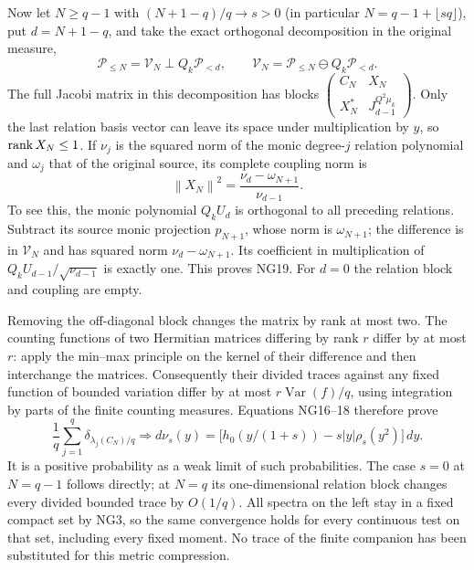 \documentclass[11pt]{article}
\newcommand{\PP}{\mathcal P}\newcommand{\dd}{\,d}
\newcommand{\norm}[1]{\left\lVert#1\right\rVert}
\begin{document}
Now let $N\ge q-1$ with $(N+1-q)/q\to s>0$ (in particular
$N=q-1+\lfloor sq\rfloor$), put $d=N+1-q$, and take the exact
orthogonal decomposition in the original measure,
\begin{equation}\tag{NG18}
 \PP_{\le N}=\mathcal V_N\mathbin{\perp}Q_k\PP_{<d},\qquad
 \mathcal V_N=\PP_{\le N}\ominus Q_k\PP_{<d}.
\end{equation}
The full Jacobi matrix in this decomposition has blocks
$\left(\begin{smallmatrix}C_N&X_N\\X_N^*&J_{d-1}^{Q^2\mu_k}\end{smallmatrix}\right)$.
Only the last relation basis vector can leave its space under
multiplication by $y$, so $\operatorname{rank} X_N\le1$.
If $\nu_j$ is the squared norm of the monic degree-$j$ relation
polynomial and $\omega_j$ that of the original source, its complete
coupling norm is
\begin{equation}\tag{NG19}
 \norm{X_N}^2=\frac{\nu_d-\omega_{N+1}}{\nu_{d-1}}.
\end{equation}
To see this, the monic polynomial $Q_kU_d$ is orthogonal to all preceding
relations. Subtract its source monic projection $p_{N+1}$, whose norm
is $\omega_{N+1}$; the difference is in $\mathcal V_N$ and has squared
norm $\nu_d-\omega_{N+1}$. Its coefficient in multiplication of
$Q_kU_{d-1}/\sqrt{\nu_{d-1}}$ is exactly one. This proves NG19.
For $d=0$ the relation block and coupling are empty.

Removing the off-diagonal block changes the matrix by rank at most two.
The counting functions of two Hermitian matrices differing by rank $r$
differ by at most $r$: apply the min--max principle on the kernel of
their difference and then interchange the matrices. Consequently their
divided traces against any fixed function of bounded variation differ
by at most $r\operatorname{Var}(f)/q$, using integration by parts of
the finite counting measures. Equations NG16--18 therefore prove
\begin{equation}\tag{NG20}
 \frac1q\sum_{j=1}^q\delta_{\lambda_j(C_N)/q}\Longrightarrow
 d\nu_s(y)=\bigl[h_0(y/(1+s))-s|y|\rho_s(y^2)\bigr]\dd y.
\end{equation}
It is a positive probability as a weak limit of such probabilities.
The case $s=0$ at $N=q-1$ follows directly; at $N=q$ its one-dimensional
relation block changes every divided bounded trace by $O(1/q)$.
All spectra on the left stay in a fixed compact set by NG3, so the
same convergence holds for every continuous test on that set, including
every fixed moment. No trace of the finite companion has been substituted
for this metric compression.
\end{document}
